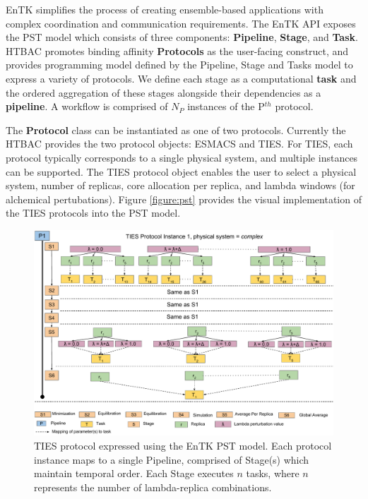 
EnTK simplifies the process of creating ensemble-based applications with
complex coordination and communication requirements. The EnTK API exposes the
PST model which consists of three components: \textbf{Pipeline},
\textbf{Stage}, and \textbf{Task}. HTBAC promotes binding affinity  {\bf
Protocols} as the user-facing construct, and provides programming model
defined by the Pipeline, Stage and Tasks model to express a variety of
protocols. We define each stage as a computational \textbf{task} and the
ordered aggregation of these stages alongside their dependencies as a
\textbf{pipeline}. A workflow is comprised of $N_P$ instances of the P$^{th}$
protocol.

The \textbf{Protocol} class can be instantiated as one of two protocols.
Currently the HTBAC provides the two protocol objects: ESMACS and TIES. For
TIES, each protocol typically corresponds to a single physical system, and
multiple instances can be supported. The TIES protocol object enables the user
to select a physical system, number of replicas, core allocation per replica,
and lambda windows (for alchemical pertubations). Figure \ref{figure:pst}
provides the visual implementation of the TIES protocols into the PST model.




\begin{figure}
  \centering
   \includegraphics[width=\columnwidth]{figures/_TIES_EnTK_implementation.pdf}
  \caption{TIES protocol expressed using the EnTK PST model. Each protocol instance
  maps to a single Pipeline, comprised of Stage(s) which maintain temporal order.
  Each Stage executes $n$ tasks, where $n$ represents the number of lambda-replica
  combinations.}
\label{fig:pst}
\end{figure}



